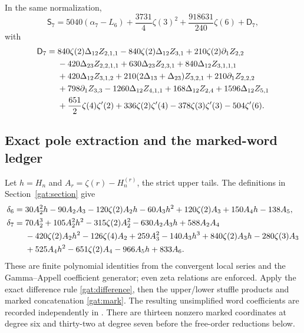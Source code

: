 \begin{theorem}
\label{hsm:seventh}
In the same normalization,
\begin{equation}\label{hsm:seventh-main}
 \boxed{\mathsf S_7=5040(\alpha_7-L_6)
      +\frac{3731}{4}\zeta(3)^2+\frac{918631}{240}\zeta(6)+\mathsf D_7,}
\end{equation}
with
\begin{align}\label{hsm:D7}
 \mathsf D_7={}&840\zeta(2)\Delta_{12}Z_{2,1,1}
       -840\zeta(2)\Delta_{12}Z_{3,1}+210\zeta(2)\partial_1Z_{2,2}\notag\\
 &-420\Delta_{23}Z_{2,2,1,1}+630\Delta_{23}Z_{2,3,1}
       +840\Delta_{12}Z_{3,1,1,1}\notag\\
 &+420\Delta_{12}Z_{3,1,2}
       +210(2\Delta_{13}+\Delta_{23})Z_{3,2,1}
       +210\partial_1Z_{2,2,2}\notag\\
 &+798\partial_1Z_{3,3}-1260\Delta_{12}Z_{4,1,1}
       +168\Delta_{12}Z_{2,4}+1596\Delta_{12}Z_{5,1}\notag\\
 &+\frac{651}{2}\zeta(4)\zeta'(2)+336\zeta(2)\zeta'(4)
       -378\zeta(3)\zeta'(3)-504\zeta'(6).
\end{align}
\end{theorem}

\subsection{Exact pole extraction and the marked-word ledger}

Let $h=H_n$ and $A_r=\zeta(r)-H_n^{(r)}$, the strict upper tails.
The definitions in Section~\ref{gat:section} give
\begin{align}\label{hsm:delta6}
 \delta_6={}&30A_2^2h-90A_2A_3-120\zeta(2)A_2h
       -60A_3h^2+120\zeta(2)A_3+150A_4h-138A_5,\\
 \delta_7={}&70A_2^3+105A_2^2h^2-315\zeta(2)A_2^2
       -630A_2A_3h+588A_2A_4\notag\\
 &-420\zeta(2)A_2h^2-126\zeta(4)A_2+259A_3^2
       -140A_3h^3+840\zeta(2)A_3h-280\zeta(3)A_3\notag\\
 &+525A_4h^2-651\zeta(2)A_4-966A_5h+833A_6.
       \label{hsm:delta7}
\end{align}
These are finite polynomial identities from the convergent local
series and the Gamma--Appell coefficient generator; even zeta
relations are enforced.  Apply the exact difference rule
\eqref{gat:difference}, then the upper/lower stuffle products and
marked concatenation \eqref{gat:mark}.  The resulting unsimplified
word coefficients are recorded independently in
.  There are thirteen
nonzero marked coordinates at degree six and thirty-two at degree
seven before the free-order reductions below.

